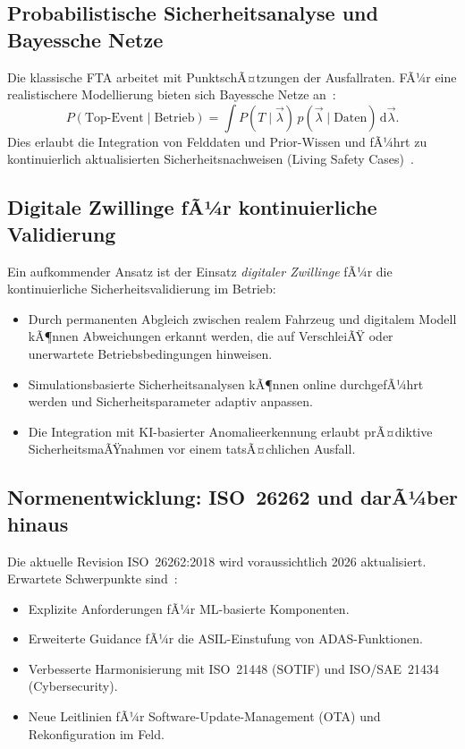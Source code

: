 ﻿\documentclass[a4paper,12pt]{article}
\theoremstyle{definition}
\begin{document}
\subsection{Probabilistische Sicherheitsanalyse und Bayessche Netze}

Die klassische FTA arbeitet mit PunktschÃ¤tzungen der Ausfallraten.
FÃ¼r eine realistischere Modellierung bieten sich Bayessche Netze
an~\cite{neil_2016}:
\[
  P(\text{Top-Event} \mid \text{Betrieb})
  = \int P(T \mid \vec{\lambda})\,
    p(\vec{\lambda} \mid \text{Daten})\,\mathrm{d}\vec{\lambda}.
\]
Dies erlaubt die Integration von Felddaten und Prior-Wissen und
fÃ¼hrt zu kontinuierlich aktualisierten Sicherheitsnachweisen
(Living Safety Cases)~\cite{bishop_2017}.

\subsection{Digitale Zwillinge fÃ¼r kontinuierliche Validierung}

Ein aufkommender Ansatz ist der Einsatz \emph{digitaler Zwillinge}
fÃ¼r die kontinuierliche Sicherheitsvalidierung im Betrieb:

\begin{itemize}
  \item Durch permanenten Abgleich zwischen realem Fahrzeug und
        digitalem Modell kÃ¶nnen Abweichungen erkannt werden, die
        auf VerschleiÃŸ oder unerwartete Betriebsbedingungen hinweisen.
  \item Simulationsbasierte Sicherheitsanalysen kÃ¶nnen online
        durchgefÃ¼hrt werden und Sicherheitsparameter adaptiv anpassen.
  \item Die Integration mit KI-basierter Anomalieerkennung erlaubt
        prÃ¤diktive SicherheitsmaÃŸnahmen vor einem tatsÃ¤chlichen
        Ausfall.
\end{itemize}

\subsection{Normenentwicklung: ISO~26262 und darÃ¼ber hinaus}

Die aktuelle Revision ISO~26262:2018 wird voraussichtlich 2026
aktualisiert. Erwartete Schwerpunkte sind~\cite{autosar_2023}:
\begin{itemize}
  \item Explizite Anforderungen fÃ¼r ML-basierte Komponenten.
  \item Erweiterte Guidance fÃ¼r die ASIL-Einstufung von
        ADAS-Funktionen.
  \item Verbesserte Harmonisierung mit ISO~21448 (SOTIF) und
        ISO/SAE~21434 (Cybersecurity).
  \item Neue Leitlinien fÃ¼r Software-Update-Management (OTA) und
        Rekonfiguration im Feld.
\end{itemize}
\end{document}
